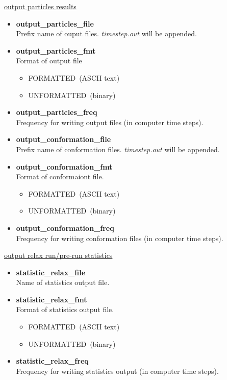 \documentclass[a4paper,10pt]{article}
\begin{document}
\begin{center}
\underline{\textlangle output particles results \textrangle}
\end{center}

\begin{itemize}
 \item 
\textbf{output\_particles\_file} \\
Prefix name of ouput files. 
\textit{timestep.out} will be appended.

\item 
\textbf{output\_particles\_fmt} \\
Format of output file
\begin{itemize}
\item
FORMATTED~(ASCII text)
\item
UNFORMATTED~(binary)
\end{itemize}
\item \textbf{output\_particles\_freq}\\
Frequency for writing output files
(in computer time steps).
\end{itemize}

\begin{itemize}
 \item \textbf{output\_conformation\_file} \\
Prefix name of conformation files. 
\textit{timestep.out} will be appended.
\item \textbf{output\_conformation\_fmt}  \\
Format of conformaiont file. 
\begin{itemize}
 \item 
FORMATTED~(ASCII text)
\item
UNFORMATTED~(binary)
\end{itemize}
\item \textbf{output\_conformation\_freq} \\
Frequency for writing conformation files
(in computer time steps).
\end{itemize}

\begin{center}
\underline{\textlangle output relax run/pre-run statistics \textrangle}
\end{center}

\begin{itemize}
\item 
\textbf{statistic\_relax\_file} \\
Name of statistics output file.
\item  \textbf{statistic\_relax\_fmt} \\
Format of statistics output file.
\begin{itemize}
 \item 
FORMATTED~(ASCII text)
\item
UNFORMATTED~(binary)
\end{itemize}

\item \textbf{statistic\_relax\_freq} \\
Frequency for writing statistics output
(in computer time steps).
\end{itemize}
\end{document}
